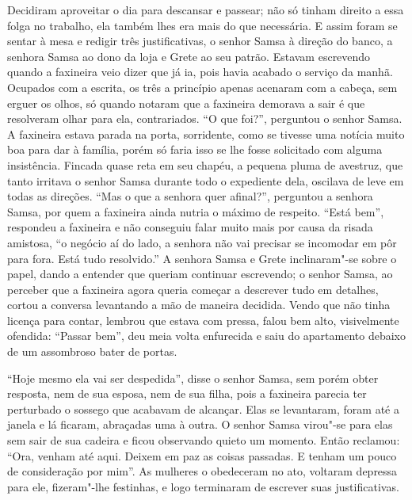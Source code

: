 Decidiram aproveitar o dia para descansar e passear; não só tinham direito
a essa folga no trabalho, ela também lhes era mais do que necessária. E
assim foram se sentar à mesa e redigir três justificativas, o senhor Samsa
à direção do banco, a senhora Samsa ao dono da loja e Grete ao seu patrão.
Estavam escrevendo quando a faxineira veio dizer que já ia, pois havia
acabado o serviço da manhã. Ocupados com a escrita, os três a princípio
apenas acenaram com a cabeça, sem erguer os olhos, só quando notaram que a
faxineira demorava a sair é que resolveram olhar para ela, contrariados.
“O que foi?”, perguntou o senhor Samsa. A faxineira estava parada na
porta, sorridente, como se tivesse uma notícia muito boa para dar à
família, porém só faria isso se lhe fosse solicitado com alguma
insistência. Fincada quase reta em seu chapéu, a pequena pluma de
avestruz, que tanto irritava o senhor Samsa durante todo o expediente
dela, oscilava de leve em todas as direções. “Mas o que a senhora quer
afinal?”, perguntou a senhora Samsa, por quem a faxineira ainda nutria o
máximo de respeito. “Está bem”, respondeu a faxineira e não conseguiu
falar muito mais por causa da risada amistosa, “o negócio aí do lado, a
senhora não vai precisar se incomodar em pôr para fora. Está tudo
resolvido.” A senhora Samsa e Grete inclinaram"-se sobre o papel, dando a
entender que queriam continuar escrevendo; o senhor Samsa, ao perceber que
a faxineira agora queria começar a descrever tudo em detalhes, cortou a
conversa levantando a mão de maneira decidida. Vendo que não tinha licença
para contar, lembrou que estava com pressa, falou bem alto, visivelmente
ofendida: “Passar bem”, deu meia volta enfurecida e saiu do apartamento
debaixo de um assombroso bater de portas.

“Hoje mesmo ela vai ser despedida”, disse o senhor Samsa, sem porém obter
resposta, nem de sua esposa, nem de sua filha, pois a faxineira parecia
ter perturbado o sossego que acabavam de alcançar. Elas se levantaram,
foram até a janela e lá ficaram, abraçadas uma à outra. O senhor Samsa
virou"-se para elas sem sair de sua cadeira e ficou observando quieto um
momento. Então reclamou: “Ora, venham até aqui. Deixem em paz as coisas
passadas. E tenham um pouco de consideração por mim”. As mulheres o
obedeceram no ato, voltaram depressa para ele, fizeram"-lhe festinhas, e
logo terminaram de escrever suas justificativas.

